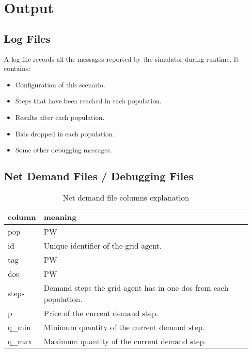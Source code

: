 \documentclass[12pt]{article}
\begin{document}
\section{Output}
\label{sec:output}

\subsection{Log Files}
\label{subsec:output_log}

A log file records all the messages reported by the simulator during runtime. 
It contains: 
\begin{itemize}
    \item{Configuration of this scenario.}
    \item{Steps that have been reached in each population.}
    \item{Results after each population.}
    \item{Bids dropped in each population.}
    \item{Some other debugging messages.}
\end{itemize}

\subsection{Net Demand Files / Debugging Files}
\label{subsec:output_netdemand}

\begin{table}[H]
    \caption{Net demand file columns explanation}
    \begin{center}
        \begin{tabular} {| l | l |}
            \hline
            \textbf{column} & \textbf{meaning} \\ \hline
            pop & PW \\ \hline
            id & Unique identifier of the grid agent. \\ \hline
            tag & PW \\ \hline
            dos & PW \\ \hline
            steps & Demand steps the grid agent has in one dos from each population. \\ \hline
            p & Price of the current demand step. \\ \hline
            q\_min & Minimum quantity of the current demand step. \\ \hline
            q\_max & Maximum quantity of the current demand step. \\ \hline
        \end{tabular}
    \end{center}
\end{table}
\end{document}
